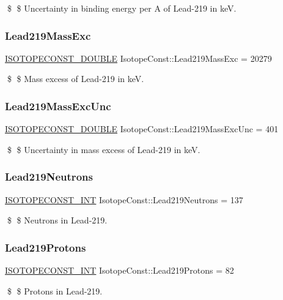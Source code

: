 \$ \$ Uncertainty in binding energy per A of Lead-\/219 in keV. \mbox{\label{group___isotope_const-_lead-_pb219_ga818acebb641b26b1de6b6663fe49d3a3}} 
\subsubsection{\texorpdfstring{Lead219\+Mass\+Exc}{Lead219MassExc}}
{\footnotesize\ttfamily \mbox{\hyperlink{group___isotope_const-_macros_ga8f45a7272ce02c0b4c65c44636ed719a}{I\+S\+O\+T\+O\+P\+E\+C\+O\+N\+S\+T\+\_\+\+D\+O\+U\+B\+LE}} Isotope\+Const\+::\+Lead219\+Mass\+Exc = 20279}

\$ \$ Mass excess of Lead-\/219 in keV. \mbox{\label{group___isotope_const-_lead-_pb219_ga74407d6f8258d3228d9ae00086a66158}} 
\subsubsection{\texorpdfstring{Lead219\+Mass\+Exc\+Unc}{Lead219MassExcUnc}}
{\footnotesize\ttfamily \mbox{\hyperlink{group___isotope_const-_macros_ga8f45a7272ce02c0b4c65c44636ed719a}{I\+S\+O\+T\+O\+P\+E\+C\+O\+N\+S\+T\+\_\+\+D\+O\+U\+B\+LE}} Isotope\+Const\+::\+Lead219\+Mass\+Exc\+Unc = 401}

\$ \$ Uncertainty in mass excess of Lead-\/219 in keV. \mbox{\label{group___isotope_const-_lead-_pb219_ga50e5fe2c8a737136256a35094828ef9c}} 
\subsubsection{\texorpdfstring{Lead219\+Neutrons}{Lead219Neutrons}}
{\footnotesize\ttfamily \mbox{\hyperlink{group___isotope_const-_macros_ga5f18360b3e99483a35c32d789e62621c}{I\+S\+O\+T\+O\+P\+E\+C\+O\+N\+S\+T\+\_\+\+I\+NT}} Isotope\+Const\+::\+Lead219\+Neutrons = 137}

\$ \$ Neutrons in Lead-\/219. \mbox{\label{group___isotope_const-_lead-_pb219_ga1df5440fc797472034c65b3d1b0d1ce5}} 
\subsubsection{\texorpdfstring{Lead219\+Protons}{Lead219Protons}}
{\footnotesize\ttfamily \mbox{\hyperlink{group___isotope_const-_macros_ga5f18360b3e99483a35c32d789e62621c}{I\+S\+O\+T\+O\+P\+E\+C\+O\+N\+S\+T\+\_\+\+I\+NT}} Isotope\+Const\+::\+Lead219\+Protons = 82}

\$ \$ Protons in Lead-\/219. 